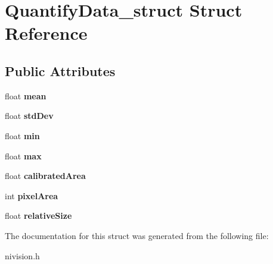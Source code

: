 \hypertarget{structQuantifyData__struct}{
\section{QuantifyData\_\-struct Struct Reference}
\label{structQuantifyData__struct}
}
\subsection*{Public Attributes}
\begin{DoxyCompactItemize}
\item 
\hypertarget{structQuantifyData__struct_a29274fac0dbb5de9e48866f99a69db40}{
float {\bfseries mean}}
\label{structQuantifyData__struct_a29274fac0dbb5de9e48866f99a69db40}

\item 
\hypertarget{structQuantifyData__struct_a418a690d88842cd96a2612254190654e}{
float {\bfseries stdDev}}
\label{structQuantifyData__struct_a418a690d88842cd96a2612254190654e}

\item 
\hypertarget{structQuantifyData__struct_af2efe660342ef79f0e466c37aace3e4b}{
float {\bfseries min}}
\label{structQuantifyData__struct_af2efe660342ef79f0e466c37aace3e4b}

\item 
\hypertarget{structQuantifyData__struct_a33146e4db24e747dd3e11d89d0f07763}{
float {\bfseries max}}
\label{structQuantifyData__struct_a33146e4db24e747dd3e11d89d0f07763}

\item 
\hypertarget{structQuantifyData__struct_a1ea0aef06d3339d5270400733dda5491}{
float {\bfseries calibratedArea}}
\label{structQuantifyData__struct_a1ea0aef06d3339d5270400733dda5491}

\item 
\hypertarget{structQuantifyData__struct_a39404e7da14a1477e98653d773100268}{
int {\bfseries pixelArea}}
\label{structQuantifyData__struct_a39404e7da14a1477e98653d773100268}

\item 
\hypertarget{structQuantifyData__struct_a07dd2d718b0422b7c0113b4710bbc7a7}{
float {\bfseries relativeSize}}
\label{structQuantifyData__struct_a07dd2d718b0422b7c0113b4710bbc7a7}

\end{DoxyCompactItemize}


The documentation for this struct was generated from the following file:\begin{DoxyCompactItemize}
\item 
nivision.h\end{DoxyCompactItemize}
